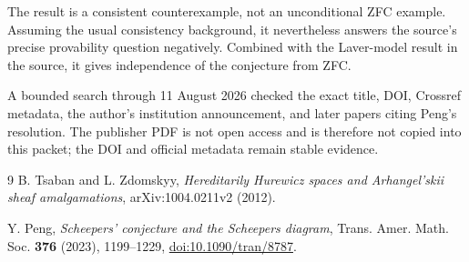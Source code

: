 \documentclass[10pt]{article}
\begin{document}
The result is a consistent counterexample, not an unconditional ZFC example.
Assuming the usual consistency background, it nevertheless answers the source's
precise provability question negatively. Combined with the Laver-model result
in the source, it gives independence of the conjecture from ZFC.

A bounded search through 11 August 2026 checked the exact title, DOI, Crossref
metadata, the author's institution announcement, and later papers citing
Peng's resolution. The publisher PDF is not open access and is therefore not
copied into this packet; the DOI and official metadata remain stable evidence.

\begin{thebibliography}{9}
B. Tsaban and L. Zdomskyy,
\emph{Hereditarily Hurewicz spaces and Arhangel'skii sheaf amalgamations},
arXiv:1004.0211v2 (2012).

Y. Peng,
\emph{Scheepers' conjecture and the Scheepers diagram},
Trans. Amer. Math. Soc. \textbf{376} (2023), 1199--1229,
\href{https://doi.org/10.1090/tran/8787}{doi:10.1090/tran/8787}.
\end{thebibliography}
\end{document}
